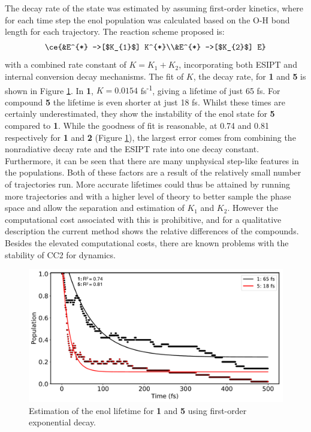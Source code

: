 The decay rate of the \Estar{} state was estimated by assuming first-order kinetics, where for each time step the enol population was calculated based on the O-H bond length for each trajectory. The reaction scheme proposed is:
\begin{align*}
\centering
\ce{&E^{*} ->[$K_{1}$] K^{*}\\&E^{*} ->[$K_{2}$] E}
\end{align*}
with a combined rate constant of $K=K_{1}+K_{2}$, incorporating both ESIPT and internal conversion decay mechanisms. The fit of $K$, the \Estar{} decay rate, for \textbf{1} and \textbf{5} is shown in Figure \ref{figure: HC_Dynamics_Enolfit}. In \textbf{1}, $K=0.0154$ fs\textsuperscript{-1}, giving a lifetime of just 65 fs. For compound \textbf{5} the lifetime is even shorter at just 18 fs. Whilst these times are certainly underestimated, they show the instability of the enol state for \textbf{5} compared to \textbf{1}. While the goodness of fit is reasonable, at 0.74 and 0.81 respectively for \textbf{1} and \textbf{2} (Figure \ref{figure: HC_Dynamics_Enolfit}), the largest error comes from combining the nonradiative decay rate and the ESIPT rate into one decay constant. Furthermore, it can be seen that there are many unphysical step-like features in the populations. Both of these factors are a result of the relatively small number of trajectories run. More accurate lifetimes could thus be attained by running more trajectories and with a higher level of theory to better sample the phase space and allow the separation and estimation of $K_{1}$ and $K_{2}$. However the computational cost associated with this is prohibitive, and for a qualitative description the current method shows the relative differences of the compounds. Besides the elevated computational costs, there are known problems with the stability of CC2 for dynamics.\cite{Plasser2014}

\begin{figure}[t]
\centering
  \includegraphics[width=0.9\linewidth]{3nonradiativedecay/HC_dynamics_enolfit.pdf}
  \caption[Estimation of enol decay rate]{Estimation of the enol lifetime for \textbf{1} and \textbf{5} using first-order exponential decay.}
  \label{figure: HC_Dynamics_Enolfit}
\end{figure}


